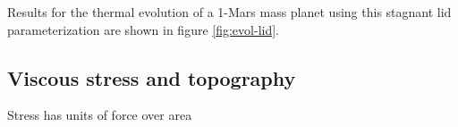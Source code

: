 \documentclass[10pt,a4paper]{article}
\begin{document}

Results for the thermal evolution of a 1-Mars mass planet using this stagnant lid parameterization are shown in figure \ref{fig:evol-lid}.

%



\subsection{Viscous stress and topography}

Stress has units of force over area
\end{document}
